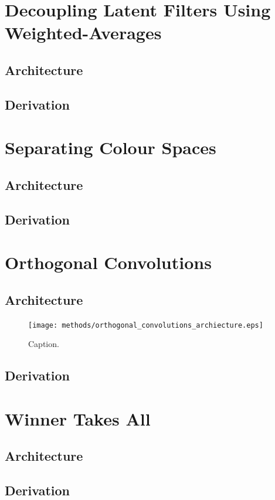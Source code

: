 %
%
%
%
%
\section{Decoupling Latent Filters Using Weighted-Averages}
\lipsum[2]
\subsection{Architecture}
\subsection{Derivation}

%
%
%
%
%
\section{Separating Colour Spaces}
\lipsum[2]
\subsection{Architecture}
\subsection{Derivation}

%
%
%
%
%
\section{Orthogonal Convolutions}
\lipsum[2]
\subsection{Architecture}
\begin{figure}[h!]
\centering
\captionsetup{justification=centering}
\texttt{[image: methods/orthogonal\_convolutions\_archiecture.eps]}
\caption{Caption.}
\label{fig:orthogonal_convolutions_archiecture}
\end{figure}

\subsection{Derivation}

%
%
%
%
%
\section{Winner Takes All}
\lipsum[2]
\subsection{Architecture}
\subsection{Derivation}
